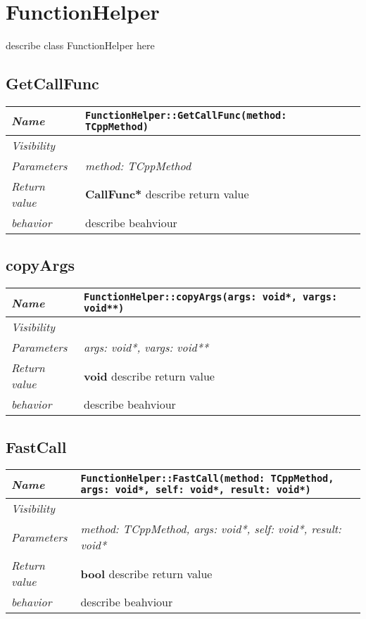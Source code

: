  \chapter{FunctionHelper}
describe class FunctionHelper here
\section{GetCallFunc}
\begin{longtable}{p{3cm} @{\hskip 1cm} p{12cm}}
 \hline
\textit{Name} & \texttt{FunctionHelper::GetCallFunc(method: TCppMethod)}\\
\hline
 \textit{Visibility} & \\
\hline
\textit{Parameters} & \textit{method: TCppMethod}\\
\hline
\textit{Return value} & \textbf{ CallFunc*} describe return value\\
  \hline
 \textit{behavior} & describe beahviour \\
\hline
\end{longtable} \pagebreak
 \section{copyArgs}
\begin{longtable}{p{3cm} @{\hskip 1cm} p{12cm}}
 \hline
\textit{Name} & \texttt{FunctionHelper::copyArgs(args: void*, vargs: void**)}\\
\hline
 \textit{Visibility} & \\
\hline
\textit{Parameters} & \textit{args: void*, vargs: void**}\\
\hline
\textit{Return value} & \textbf{ void} describe return value\\
  \hline
 \textit{behavior} & describe beahviour \\
\hline
\end{longtable} \pagebreak
 \section{FastCall}
\begin{longtable}{p{3cm} @{\hskip 1cm} p{12cm}}
 \hline
\textit{Name} & \texttt{FunctionHelper::FastCall(method: TCppMethod, args: void*, self: void*, result: void*)}\\
\hline
 \textit{Visibility} & \\
\hline
\textit{Parameters} & \textit{method: TCppMethod, args: void*, self: void*, result: void*}\\
\hline
\textit{Return value} & \textbf{ bool} describe return value\\
  \hline
 \textit{behavior} & describe beahviour \\
\hline
\end{longtable} \pagebreak
